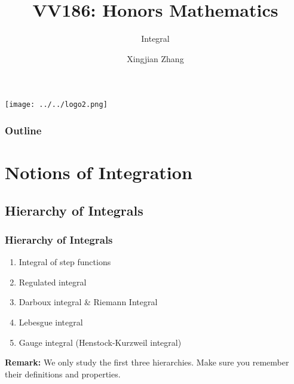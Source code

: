 \documentclass[10pt, t]{beamer}
\title{VV186: Honors Mathematics}
\subtitle{Integral}
\institute[UM-SJTU JI]{Univerity of Michigan-Shanghai Jiao Tong University Joint Institute}
\author{Xingjian Zhang}
\begin{document}
\begin{frame}
    \titlepage
    \begin{center}
        \texttt{[image: ../../logo2.png]}
    \end{center}
\end{frame}

\begin{frame}
    \frametitle{Outline}
    \begin{spacing}{1}
        \tableofcontents
    \end{spacing}
\end{frame}

\section{Notions of Integration}
\subsection{Hierarchy of Integrals}
\begin{frame}
    \frametitle{Hierarchy of Integrals}
    \begin{enumerate}
        \item Integral of step functions
        \item Regulated integral
        \item Darboux integral \& Riemann Integral
        \item Lebesgue integral
        \item Gauge integral (Henstock-Kurzweil integral)
    \end{enumerate}
    \textbf{Remark:} We only study the first three hierarchies. Make sure you remember their definitions and properties.
\end{frame}
\end{document}
